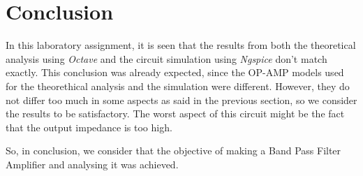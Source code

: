 \section{Conclusion}
\label{sec:conclusion}

In this laboratory assignment, it is seen that the results from both the theoretical analysis using \textit{Octave} and the circuit simulation using \textit{Ngspice} don't match exactly. This conclusion was already expected, since the OP-AMP models used for the theorethical analysis and the simulation were different. However, they do not differ too much in some aspects as said in the previous section, so we consider the results to be satisfactory. The worst aspect of this circuit might be the fact that the output impedance is too high.
\par
So, in conclusion, we consider that the objective of making a Band Pass Filter Amplifier and analysing it was achieved. 
